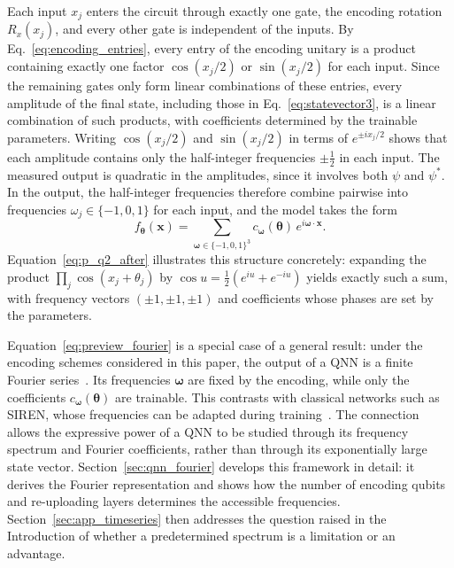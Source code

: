 \documentclass[12pt]{article}
\numberwithin{equation}{section}  %
\begin{document}
Each input $x_j$ enters the circuit through exactly one gate, the encoding rotation $R_x(x_j)$, and every other gate is independent of the inputs. By Eq.~\eqref{eq:encoding_entries}, every entry of the encoding unitary is a product containing exactly one factor $\cos(x_j/2)$ or $\sin(x_j/2)$ for each input. Since the remaining gates only form linear combinations of these entries, every amplitude of the final state, including those in Eq.~\eqref{eq:statevector3}, is a linear combination of such products, with coefficients determined by the trainable parameters. Writing $\cos(x_j/2)$ and $\sin(x_j/2)$ in terms of $e^{\pm i x_j/2}$ shows that each amplitude contains only the half-integer frequencies $\pm\frac{1}{2}$ in each input. The measured output is quadratic in the amplitudes, since it involves both $\psi$ and $\psi^*$. In the output, the half-integer frequencies therefore combine pairwise into frequencies $\omega_j \in \{-1, 0, 1\}$ for each input, and the model takes the form
\begin{equation}
f_{\boldsymbol{\theta}}(\mathbf{x}) = \sum_{\boldsymbol{\omega} \in \{-1, 0, 1\}^3} c_{\boldsymbol{\omega}}(\boldsymbol{\theta})\, e^{i\boldsymbol{\omega} \cdot \mathbf{x}}.
\label{eq:preview_fourier}
\end{equation}
Equation~\eqref{eq:p_q2_after} illustrates this structure concretely: expanding the product $\prod_j \cos(x_j + \theta_j)$ by $\cos u = \frac{1}{2}(e^{iu} + e^{-iu})$ yields exactly such a sum, with frequency vectors $(\pm 1, \pm 1, \pm 1)$ and coefficients whose phases are set by the parameters.

Equation~\eqref{eq:preview_fourier} is a special case of a general result: under the encoding schemes considered in this paper, the output of a QNN is a finite Fourier series~\cite{schuld2021effect}. Its frequencies $\boldsymbol{\omega}$ are fixed by the encoding, while only the coefficients $c_{\boldsymbol{\omega}}(\boldsymbol{\theta})$ are trainable. This contrasts with classical networks such as SIREN, whose frequencies can be adapted during training~\cite{sitzmann2020implicit}. The connection allows the expressive power of a QNN to be studied through its frequency spectrum and Fourier coefficients, rather than through its exponentially large state vector. Section~\ref{sec:qnn_fourier} develops this framework in detail: it derives the Fourier representation and shows how the number of encoding qubits and re-uploading layers determines the accessible frequencies. Section~\ref{sec:app_timeseries} then addresses the question raised in the Introduction of whether a predetermined spectrum is a limitation or an advantage.
\end{document}
